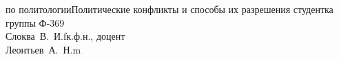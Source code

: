 


\usepackage{color}
\usepackage[colorlinks,linkcolor=black,filecolor=blue,citecolor=darkgreen]{hyperref}


    {по политологии}{Политические конфликты и способы их разрешения}
    {студентка группы Ф-369\\Слоква~В.~И.}{f}{к.ф.н., доцент\\Леонтьев~А.~Н.}{m}
        
    \tableofcontents
    \thispagestyle{empty}
    \newpage
    
